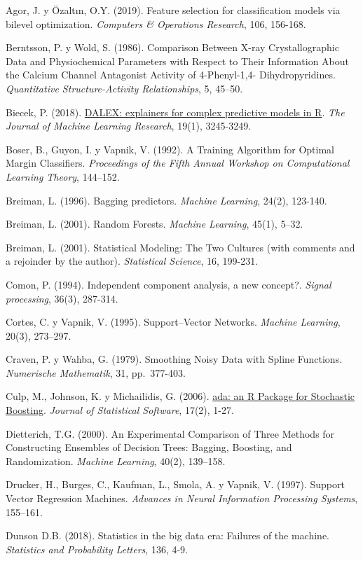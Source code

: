 \documentclass[
]{book}
\theoremstyle{break}
\theoremstyle{definition}
\theoremstyle{definition}
\theoremstyle{definition}
\theoremstyle{remark}
\begin{document}
Agor, J. y Özaltın, O.Y. (2019). Feature selection for classification models via bilevel optimization. \emph{Computers \& Operations Research}, 106, 156-168.

Berntsson, P. y Wold, S. (1986). Comparison Between X-ray Crystallographic Data and Physiochemical Parameters with Respect to Their Information About the Calcium Channel Antagonist Activity of 4-Phenyl-1,4-
Dihydropyridines. \emph{Quantitative Structure-Activity Relationships}, 5, 45--50.

Biecek, P. (2018). \href{http://www.jmlr.org/papers/volume19/18-416/18-416.pdf}{DALEX: explainers for complex predictive models in R}. \emph{The Journal of Machine Learning Research}, 19(1), 3245-3249.

Boser, B., Guyon, I. y Vapnik, V. (1992). A Training Algorithm for Optimal Margin Classifiers. \emph{Proceedings of the Fifth Annual Workshop on Computational Learning Theory}, 144--152.

Breiman, L. (1996). Bagging predictors. \emph{Machine Learning}, 24(2), 123-140.

Breiman, L. (2001). Random Forests. \emph{Machine Learning}, 45(1), 5--32.

Breiman, L. (2001). Statistical Modeling: The Two Cultures (with comments and a rejoinder by the author). \emph{Statistical Science}, 16, 199-231.

Comon, P. (1994). Independent component analysis, a new concept?. \emph{Signal processing}, 36(3), 287-314.

Cortes, C. y Vapnik, V. (1995). Support--Vector Networks. \emph{Machine Learning}, 20(3), 273--297.

Craven, P. y Wahba, G. (1979). Smoothing Noisy Data with Spline Functions. \emph{Numerische Mathematik}, 31, pp.~377-403.

Culp, M., Johnson, K. y Michailidis, G. (2006). \href{https://www.jstatsoft.org/article/view/v017i02}{ada: an R Package for Stochastic Boosting}. \emph{Journal of Statistical Software}, 17(2), 1-27.

Dietterich, T.G. (2000). An Experimental Comparison of Three Methods for Constructing Ensembles of Decision Trees: Bagging, Boosting, and Randomization. \emph{Machine Learning}, 40(2), 139--158.

Drucker, H., Burges, C., Kaufman, L., Smola, A. y Vapnik, V. (1997). Support Vector Regression Machines. \emph{Advances in Neural Information Processing Systems}, 155--161.

Dunson D.B. (2018). Statistics in the big data era: Failures of the machine. \emph{Statistics and Probability Letters}, 136, 4-9.
\end{document}
